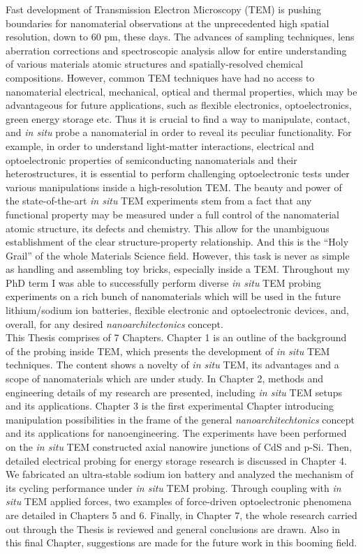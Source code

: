 \justify

Fast development of Transmission Electron Microscopy (TEM) is pushing boundaries for nanomaterial observations at the unprecedented high spatial resolution, down to 60 pm, these days. The advances of sampling techniques, lens aberration corrections and spectroscopic analysis allow for entire understanding of various materials atomic structures and spatially-resolved chemical compositions. However, common TEM techniques have had no access to nanomaterial electrical, mechanical, optical and thermal properties, which may be advantageous for future applications, such as flexible electronics, optoelectronics, green energy storage etc. Thus it is crucial to find a way to manipulate, contact, and \textit{in situ} probe a nanomaterial in order to reveal its peculiar functionality. For example, in order to understand light-matter interactions, electrical and optoelectronic properties of semiconducting nanomaterials and their heterostructures, it is essential to perform challenging optoelectronic tests under various manipulations inside a high-resolution TEM. The beauty and power of the state-of-the-art \textit{in situ} TEM experiments stem from a fact that any functional property may be measured under a full control of the nanomaterial atomic structure, its defects and chemistry. This allow for the unambiguous establishment of the clear structure-property relationship. And this is the “Holy Grail” of the whole Materials Science field. However, this task is never as simple as handling and assembling toy bricks, especially inside a TEM. Throughout my PhD term I was able to successfully perform diverse \textit{in situ} TEM probing experiments on a rich bunch of nanomaterials which will be used in the future lithium/sodium ion batteries, flexible electronic and optoelectronic devices, and, overall, for any desired \textit{nanoarchitectonics} concept. \\
This Thesis comprises of 7 Chapters. Chapter 1 is an outline of the background of the probing inside TEM, which presents the development of \textit{in situ} TEM techniques. The content shows a novelty of {\it in situ} TEM, its advantages and a scope of nanomaterials which are under study. In Chapter 2, methods and engineering details of my research are presented, including {\it in situ} TEM setups and its applications. Chapter 3 is the first experimental Chapter introducing manipulation possibilities in the frame of the general {\it nanoarchitechtonics} concept and its applications for nanoengineering. The experiments have been performed on the {\it in situ} TEM constructed axial nanowire junctions of CdS and p-Si. Then, detailed electrical probing for energy storage research is discussed in Chapter 4. We fabricated an ultra-stable sodium ion battery and analyzed the mechanism of its cycling performance under {\it in situ} TEM probing. Through coupling with {\it in situ} TEM applied forces, two examples of force-driven optoelectronic phenomena are detailed in Chapters 5 and 6. Finally, in Chapter 7, the whole research carried out through the Thesis is reviewed and general conclusions are drawn. Also in this final Chapter, suggestions are made for the future work in this booming field. 
